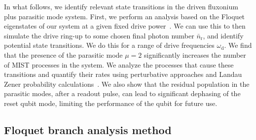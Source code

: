 \documentclass[%
reprint,
superscriptaddress,
 amsmath,amssymb,
 aps,
 prx,
longbibliography,
floatfix,
]{revtex4-2}
\begin{document}
In what follows, we identify relevant state transitions in the driven fluxonium plus parasitic mode system. First, we perform an analysis based on the Floquet eigenstates of our system at a given fixed drive power~\cite{khezri2023measurement,cohen2023reminiscence,dumas2024unified}. We can use this to then simulate the drive ring-up to some chosen final photon number $\bar{n}_\textrm{r}$, and identify potential state transitions.  We do this for a range of drive frequencies $\omega_\textrm{d}$. We find that the presence of the parasitic mode $\mu=2$ significantly increases the number of MIST processes in the system. We analyze the processes that cause these transitions and quantify their rates using perturbative approaches and Landau Zener probability calculations~\cite{ikeda2022floquet}. We also show that the residual population in the parasitic modes, after a readout pulse, can lead to significant dephasing of the reset qubit mode, limiting the performance of the qubit for future use.

\subsection{Floquet branch analysis method} 
\end{document}
